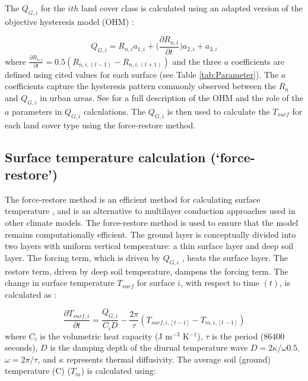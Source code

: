 \documentclass[gmd, manuscript]{copernicus}
\begin{document}
The \ensuremath{Q_{G,i}} for the $ith$ land cover class is calculated using an adapted version of the objective hysteresis model (OHM) \citep{Grimmond2002a}: 




\begin{equation} 
\ensuremath{Q_{G,i}} = R_{n,i} a_{1,i} + \Big( \frac{\partial R_{n,i}}{\partial t}   \Big) a_{2,i} + a_{3,i}
\label{eq:ohm} \end{equation} where  $\frac{\partial R_{n,i}}{\partial t} =0.5(R_{n,i,(t-1)} - R_{n,i,(t+1)})$ and the three $a$ coefficients  are defined using cited values for each surface (see Table \ref{tab:Parameter}). The $a$ coefficients capture the hysteresis pattern commonly observed between the \ensuremath{R_{n}} and \ensuremath{Q_{G,i}} in urban areas. See \cite{Grimmond1999b} for a full description of the OHM and the role of the $a$ parameters in \ensuremath{Q_{G,i}} calculations. The \ensuremath{Q_{G,i}}  is then used to calculate the $T_{surf}$ for each land cover type using the force-restore method.





\subsection{Surface temperature calculation (`force-restore')}\label{sec:tsurf}

 
The force-restore method is an efficient method for calculating surface temperature \citep{bhumralkar1975,deardorff1978}, and is an alternative to multilayer conduction approaches used in other climate models. The force-restore method is used to ensure that the model remains computationally efficient.  The ground layer is conceptually divided into two layers with uniform vertical temperature: a thin surface layer and deep soil layer. The forcing term, which is driven by \ensuremath{Q_{G,i}} , heats the surface layer. The restore term, driven by deep soil temperature, dampens the forcing term. The change in surface temperature $T_{surf}$ for surface $i$, with respect to time $(t)$, is calculated as \citep{jacobs2000}:


\begin{equation} 
\frac{\partial T_{surf,i}} {\partial t}= \frac{\ensuremath{Q_{G,i}}}{C_{i} D} - \frac{2 \pi}{\tau} (T_{surf,i,[t-1]} - T_{m,i,[t-1]})
\label{eq:force} \end{equation} where $C_{i}$ is the volumetric heat capacity (J m$^{-3}$ K$^{-1}$), $\tau$ is the period (86400 seconds), $D$ is the damping depth of the diurnal temperature wave $D = 2 \ensuremath{\kappa}  / \omega 0.5$, $\omega = 2\pi / \tau$, and \ensuremath{\kappa} represents thermal diffusivity.  The average soil (ground) temperature (\degree C) (\ensuremath{T_{m}}) is calculated using:
\end{document}

